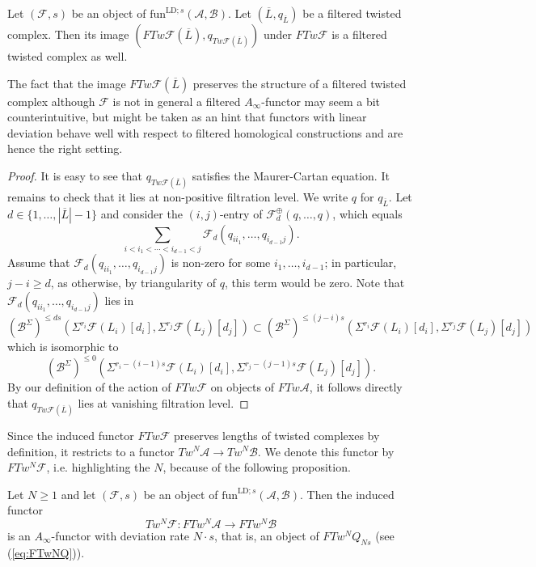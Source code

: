 \begin{lem}
	Let $(\mathcal{F},s)$ be an object of $\text{fun}^{\text{LD};s}(\mathcal{A}, \mathcal{B})$. Let $(\overline{L},q_{\overline{L}})$ be a filtered twisted complex. Then its image $(FTw\mathcal{F}(\overline{L}),q_{Tw\mathcal{F}(\overline{L})})$ under $FTw\mathcal{F}$ is a filtered twisted complex as well.
\end{lem}
\begin{rem}
	The fact that the image $FTw\mathcal{F}(\overline{L})$ preserves the structure of a filtered twisted complex although $\mathcal{F}$ is not in general a filtered $A_\infty$-functor may seem a bit counterintuitive, but might be taken as an hint that functors with linear deviation behave well with respect to filtered homological constructions and are hence the right setting.
\end{rem}
\begin{proof}
	It is easy to see that $q_{Tw\mathcal{F}(\overline{L})}$ satisfies the Maurer-Cartan equation. It remains to check that it lies at non-positive filtration level. We write $q$ for $q_{\overline{L}}$. Let $d\in \{1,\ldots, |\overline{L}|-1\}$ and consider the $(i,j)$-entry of $\mathcal{F}^\oplus_d(q,\ldots, q)$, which equals $$\sum_{i<i_1<\cdots < i_{d-1}<j} \mathcal{F}_d(q_{ii_1},\ldots, q_{i_{d-1}j}).$$ Assume that $\mathcal{F}_d(q_{ii_1},\ldots, q_{i_{d-1}j})$ is non-zero for some $i_1,\ldots, i_{d-1}$; in particular, $j-i\geq d$, as otherwise, by triangularity of $q$, this term would be zero. Note that $\mathcal{F}_d(q_{ii_1},\ldots, q_{i_{d-1}j})$ lies in $$(\mathcal{B}^\Sigma)^{\leq ds} (\Sigma^{r_i}\mathcal{F}(L_i)[d_i], \Sigma^{r_j}\mathcal{F}(L_j)[d_j])\subset (\mathcal{B}^\Sigma)^{\leq (j-i)s} (\Sigma^{r_i}\mathcal{F}(L_i)[d_i], \Sigma^{r_j}\mathcal{F}(L_j)[d_j])$$ which is isomorphic to $$ (\mathcal{B}^\Sigma)^{\leq 0} (\Sigma^{r_i-(i-1)s}\mathcal{F}(L_i)[d_i], \Sigma^{r_j-(j-1)s}\mathcal{F}(L_j)[d_j]).$$ By our definition of the action of $FTw\mathcal{F}$ on objects of $FTw\mathcal{A}$, it follows directly that $q_{Tw\mathcal{F}(\overline{L})}$ lies at vanishing filtration level.
\end{proof}
\begin{rem}
	Since the induced functor $FTw\mathcal{F}$ preserves lengths of twisted complexes by definition, it restricts to a functor $Tw^N\mathcal{A}\to Tw^N\mathcal{B}$. We denote this functor by $FTw^N\mathcal{F}$, i.e. highlighting the $N$, because of the following proposition.
\end{rem}
\begin{prop}
	Let $N\geq 1$ and let $(\mathcal{F},s)$ be an object of $\text{fun}^{\text{LD};s}(\mathcal{A}, \mathcal{B})$. Then the induced functor $$Tw^N\mathcal{F}\colon FTw^N\mathcal{A}\to FTw^N\mathcal{B}$$ is an $A_\infty$-functor with deviation rate $N\cdot s$, that is, an object of $FTw^NQ_{Ns}$ (see (\ref{eq:FTwNQ})).
\end{prop}
